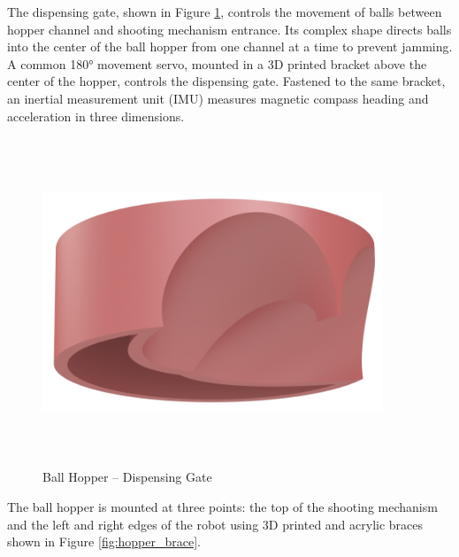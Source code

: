The dispensing gate, shown in Figure \ref{fig:dispensing_gate}, controls the movement of balls between hopper channel and shooting mechanism entrance. Its complex shape directs balls into the center of the ball hopper from one channel at a time to prevent jamming. A common \ang{180} movement servo, mounted in a 3D printed bracket above the center of the hopper, controls the dispensing gate. Fastened to the same bracket, an inertial measurement unit (IMU) measures magnetic compass heading and acceleration in three dimensions. 

\begin{figure}[H]   %
	\centering \includegraphics[width=4in, height=3.85in, keepaspectratio]{figures/dispensing_gate.png}
	\caption{Ball Hopper -- Dispensing Gate}	\label{fig:dispensing_gate}
\end{figure}

The ball hopper is mounted at three points: the top of the shooting mechanism and the left and right edges of the robot using 3D printed and acrylic braces shown in Figure \ref{fig:hopper_brace}. 

